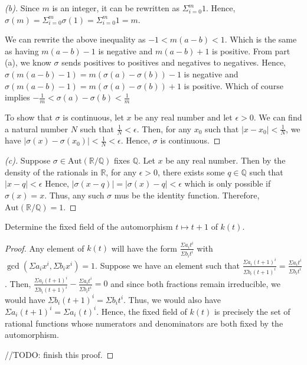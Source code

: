 \documentclass[10pt]{article}
\newcommand{\Q}{\mathbb{Q}}
\newcommand{\R}{\mathbb{R}}
\newenvironment{problem}[2][Problem]{\begin{trivlist}
		\item[\hskip \labelsep {\bfseries #1}\hskip \labelsep {\bfseries #2.}]}{\end{trivlist}}
\begin{document}
\begin{problem}{1.7}
\begin{proof}[(b)]
			Since $m$ is an integer, it can be rewritten as $\Sigma_{i=0}^m 1$. Hence, $\sigma(m) = \Sigma_{i=0}^m \sigma(1) = \Sigma_{i=0}^m 1 = m$.
			
			We can rewrite the above inequality as $-1 < m(a-b) < 1$. Which is the same as having $m(a-b) - 1$ is negative and $m(a-b) + 1$ is positive. From part (a), we know $\sigma$ sends positives to positives and negatives to negatives. Hence, $\sigma(m(a-b) - 1) = m(\sigma(a) - \sigma(b)) - 1$ is negative and $\sigma(m(a-b) - 1) = m(\sigma(a) - \sigma(b)) + 1$ is positive. Which of course implies $-\frac{1}{m} < \sigma(a) - \sigma(b) < \frac{1}{m}$
			
			To show that $\sigma$ is continuous, let $x$ be any real number and let $\epsilon > 0$. We can find a natural number $N$ such that $\frac{1}{N} < \epsilon$. Then, for any $x_0$ such that $|x-x_0| < \frac{1}{N}$, we have $|\sigma(x) - \sigma(x_0)| < \frac{1}{N} < \epsilon$. Hence, $\sigma$ is continuous.
		\end{proof}
		\begin{proof}[(c)]
			Suppose $\sigma \in \text{Aut}(\R/\Q)$ fixes $\Q$. Let $x$ be any real number. Then by the density of the rationals in $\R$, for any $\epsilon > 0$, there exists some $q \in \Q$ such that $|x-q| < \epsilon$ Hence, $|\sigma(x-q)| = |\sigma(x)-q| < \epsilon$ which is only possible if $\sigma(x) = x$. Thus, any such $\sigma$ mus be the identity function. Therefore, $\text{Aut}(\R/\Q)=1$.
		\end{proof}
	\end{problem}
	
	\begin{problem}{1.9}
		Determine the fixed field of the automorphism $t \mapsto t + 1$ of $k(t)$.
		\begin{proof}
			Any element of $k(t)$ will have the form $\frac{\Sigma a_i t^i}{\Sigma b_i t^i}$ with $\gcd(\Sigma a_i x^i, \Sigma b_i x^i) = 1$. 
			Suppose we have an element such that $\frac{\Sigma a_i (t+1)^i}{\Sigma b_i (t+1)^i} = \frac{\Sigma a_i t^i}{\Sigma b_i t^i}$. Then, $\frac{\Sigma a_i (t+1)^i}{\Sigma b_i (t+1)^i} - \frac{\Sigma a_i t^i}{\Sigma b_i t^i} = 0$ and since both fractions remain irreducible, we would have $\Sigma b_i (t+1)^i = \Sigma b_i t^i$. Thus, we would also have $\Sigma a_i (t+1)^i = \Sigma a_i (t)^i$. Hence, the fixed field of $k(t)$ is precisely the set of rational functions whose numerators and denominators are both fixed by the automorphism.
			
			//TODO: finish this proof.
		\end{proof}
	\end{problem}
	
\end{document}

